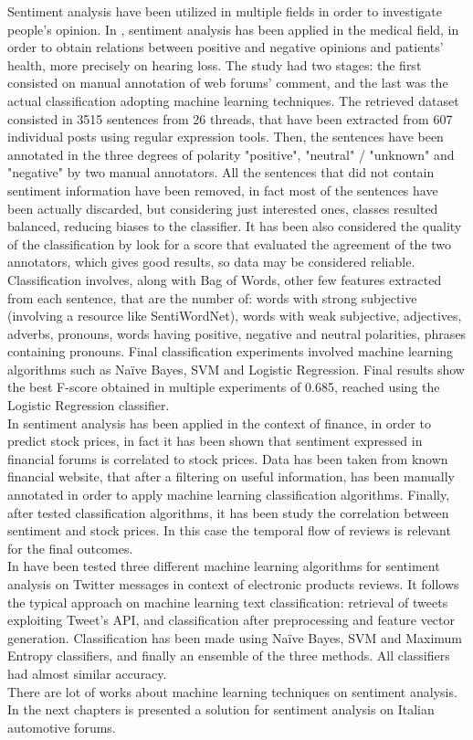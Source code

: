 Sentiment analysis have been utilized in multiple fields in order to investigate people's opinion. In \cite{ali-etal-2013-hear}, sentiment analysis has been applied in the medical field, in order to obtain relations between positive and negative opinions and patients' health, more precisely on hearing loss. The study had two stages: the first consisted on manual annotation of web forums' comment, and the last was the actual classification adopting machine learning techniques. The retrieved dataset consisted in 3515 sentences from 26 threads, that have been extracted from 607 individual posts using regular expression tools. Then, the sentences have been annotated in the three degrees of polarity "positive", "neutral" / "unknown" and "negative" by two manual annotators. All the sentences that did not contain sentiment information have been removed, in fact most of the sentences have been actually discarded, but considering just interested ones, classes resulted balanced, reducing biases to the classifier. It has been also considered the quality of the classification by look for a score that evaluated the agreement of the two annotators, which gives good results, so data may be considered reliable. Classification involves, along with Bag of Words, other few features extracted from each sentence, that are the number of: words with strong subjective (involving a resource like SentiWordNet), words with weak subjective, adjectives, adverbs, pronouns, words having positive, negative and neutral polarities, phrases containing pronouns. Final classification experiments involved machine learning algorithms such as Na{\"i}ve Bayes, \ac{SVM} and Logistic Regression. Final results show the best F-score obtained in multiple experiments of 0.685, reached using the Logistic Regression classifier.\\
In \cite{6705664} sentiment analysis has been applied in the context of finance, in order to predict stock prices, in fact it has been shown that sentiment expressed in financial forums is correlated to stock prices. Data has been taken from known financial website, that after a filtering on useful information, has been manually annotated in order to apply machine learning classification algorithms. Finally, after tested classification algorithms, it has been study the correlation between sentiment and stock prices. In this case the temporal flow of reviews is relevant for the final outcomes.\\
In \cite{6726818} have been tested three different machine learning algorithms for sentiment analysis on Twitter messages in context of electronic products reviews. It follows the typical approach on machine learning text classification: retrieval of tweets exploiting Tweet's API, and classification after preprocessing and feature vector generation. Classification has been made using Na{\"i}ve Bayes, \ac{SVM} and Maximum Entropy classifiers, and finally an ensemble of the three methods. All classifiers had almost similar accuracy.\\
There are lot of works about machine learning techniques on sentiment analysis. In the next chapters is presented a solution for sentiment analysis on Italian automotive forums.







